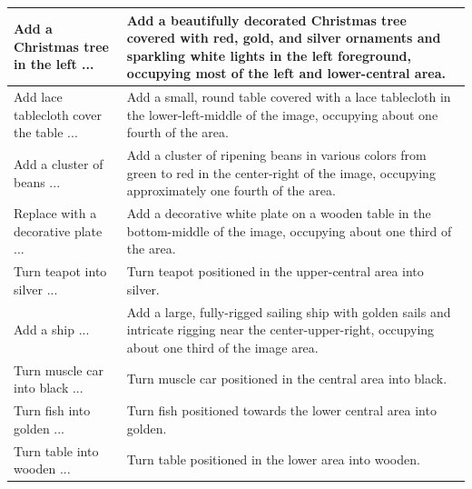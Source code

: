 \begin{table}[htbp]
\begin{tabularx}{\textwidth}{p{} X}
Add a Christmas tree in the left ...
& Add a beautifully decorated Christmas tree covered with red, gold, and silver ornaments and sparkling white lights in the left foreground, occupying most of the left and lower-central area.
\\
\midrule

Add lace tablecloth cover the table ...
& Add a small, round table covered with a lace tablecloth in the lower-left-middle of the image, occupying about one fourth of the area.
\\
\midrule

Add a cluster of beans ...
& Add a cluster of ripening beans in various colors from green to red in the center-right of the image, occupying approximately one fourth of the area.
\\
\midrule

Replace with a decorative plate ...
& Add a decorative white plate on a wooden table in the bottom-middle of the image, occupying about one third of the area.
\\
\midrule

Turn teapot into silver ...
& Turn teapot positioned in the upper-central area into silver.
\\
\midrule


Add a ship ...
& Add a large, fully-rigged sailing ship with golden sails and intricate rigging near the center-upper-right, occupying about one third of the image area.
\\
\midrule

Turn muscle car into black ...
& Turn muscle car positioned in the central area into black.
\\
\midrule

Turn fish into golden ...
& Turn fish positioned towards the lower central area into golden.
\\
\midrule

Turn table into wooden ...
& Turn table positioned in the lower area into wooden.
\\
\midrule

\bottomrule
\end{tabularx}

\label{tab:image_prompt_mapping}
\end{table}
